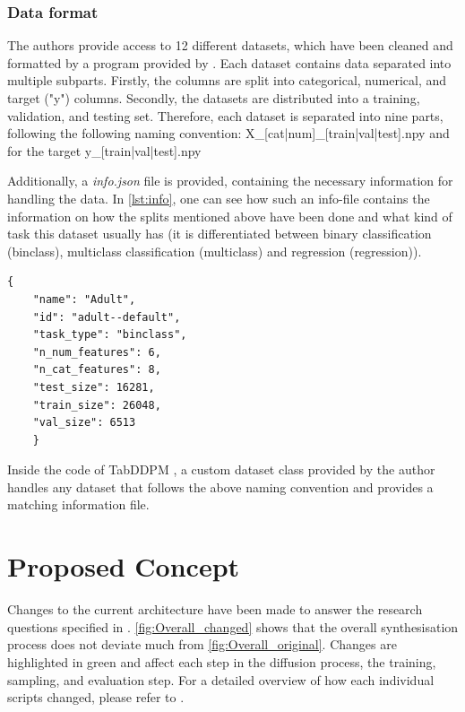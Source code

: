 \subsubsection[]{Data format}
\label{sec:data_format}
The authors provide access to 12 different datasets, which have been cleaned and formatted by a program provided by \cite{gorishniy2023EmbeddingsNumericalFeatures}.
Each dataset contains data separated into multiple subparts.
Firstly, the columns are split into categorical, numerical, and target ("y") columns.
Secondly, the datasets are distributed into a training, validation, and testing set.
Therefore, each dataset is separated into nine parts, following the following naming convention:
X\_[cat|num]\_[train|val|test].npy and for the target y\_[train|val|test].npy

Additionally, a \textit{info.json} file is provided, containing the necessary information for handling the data.
In \autoref{lst:info}, one can see how such an info-file contains the information on how the splits mentioned above have been done and what kind of task this dataset usually has (it is differentiated between binary classification (binclass), multiclass classification (multiclass) and regression (regression)).
\begin{lstlisting}[label={lst:info},caption={Example data info file}]
    {
    "name": "Adult",
    "id": "adult--default",
    "task_type": "binclass",
    "n_num_features": 6,
    "n_cat_features": 8,
    "test_size": 16281,
    "train_size": 26048,
    "val_size": 6513
    }
\end{lstlisting}
Inside the code of TabDDPM \cite{akim2023TabDDPMModellingTabular}, a custom dataset class provided by the author handles any dataset that follows the above naming convention and provides a matching information file.

\section{Proposed Concept}
\label{ch:conceptualDesign-changes}

Changes to the current architecture have been made to answer the research questions specified in .
\autoref{fig:Overall_changed} shows that the overall synthesisation process does not deviate much from \autoref{fig:Overall_original}.
Changes are highlighted in green and affect each step in the diffusion process, the training, sampling, and evaluation step.
For a detailed overview of how each individual scripts changed, please refer to .

